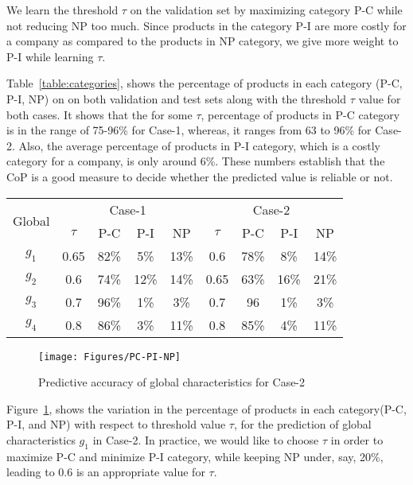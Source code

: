 {\color{red} We learn the threshold $\tau$ on the validation set by maximizing category P-C while not reducing NP too much. 
Since products in the category P-I are more costly for a company as compared to the products in NP category, 
we give more weight to P-I while learning $\tau$. 

Table~\ref{table:categories}, shows the percentage of products in each category (P-C, P-I, NP) on on both validation
and test sets along with the threshold $\tau$ value for both cases. It shows that the for some $\tau$, percentage of products in P-C category is in the range of 75-96\% for Case-1, whereas, it ranges from 63 to 96\% for Case-2. Also, the average percentage of products in P-I category, which is a costly category for a company, is only around 6\%. These numbers establish that the CoP is a good measure to decide whether the predicted value is reliable or not. 
\renewcommand{\arraystretch}{1.5}
\begin{table*}[!t]
\caption{Percentage of products in each category(P-C, P-I, NP)}
\label{table:categories}
  \centering
  \begin{tabular}{|c|c|c|c|c|c|c|c|c|}
    \hline
    \multirow{2}{*}{Global} &
      \multicolumn{4}{c|}{Case-1} &
      \multicolumn{4}{c|}{Case-2} \\
    & $\tau$ & P-C & P-I & NP & $\tau$ & P-C & P-I & NP \\
   \hline
   $g_1$ & 0.65 & 82\% & 5\% & 13\% & 0.6 & 78\% & 8\% & 14\% \\
   \hline
   $g_2$ & 0.6 & 74\% & 12\% & 14\% & 0.65 & 63\% & 16\% & 21\% \\
   \hline
   $g_3$ & 0.7 & 96\% & 1\% & 3\% & 0.7 & 96 & 1\% & 3\% \\
   \hline
   $g_4$ & 0.8 & 86\% & 3\% & 11\% & 0.8 & 85\% & 4\% & 11\% \\
   \hline
  \end{tabular}
\end{table*}

\begin{figure}
\centering
\texttt{[image: Figures/PC-PI-NP]}
\caption{Predictive accuracy of global characteristics for Case-2}
\label{fig:PC}
\end{figure}
Figure~\ref{fig:PC}, shows the variation in the percentage of products in each category(P-C, P-I, and NP) with respect to threshold value $\tau$, for the prediction of global characteristics $g_1$ in Case-2. In practice, we would like to choose $\tau$ in order to maximize P-C and minimize P-I category, 
while keeping NP under, say, 20\%, leading to 0.6 is an appropriate value for $\tau$.  }



